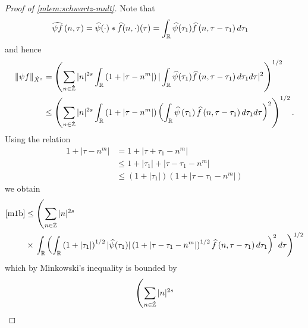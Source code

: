 \begin{proof}[Proof of \cref{mlem:schwartz-mult}]
Note that
%
%
\begin{equation*}
	\begin{split}
		\widehat{\psi f}\left( n, \tau \right)
		& = \widehat{\psi}(\cdot) * \widehat{f}(n,
		\cdot)(\tau)
		= \int_{\mathbb{R}} \widehat{\psi}(\tau_1) \widehat{f} \left( n, \tau - \tau_1 \right) 
		d\tau_1
	\end{split}
\end{equation*}
%
%
and hence
%
%
\begin{equation}
	\label{m1b}
	\begin{split}
		\|\psi f\|_{\dot{X}^s} 
		& = \left( \sum_{n \in \dot{\mathbb{Z}}} |n|^{2s} \int_{\mathbb{R}} \left( 1 + | \tau -
		n^{m} | \right) | \int_{\mathbb{R}} \widehat{\psi}(\tau_1) \widehat{f}\left( n, \tau -
		\tau_1
		\right)  d \tau_1 d \tau |^2 \right)^{1/2}
		\\
		& \le \left( \sum_{n \in \dot{\mathbb{Z}}} |n|^{2s} \int_{\mathbb{R}} \left( 1 + | \tau -
		n^{m }
		|
		\right) \left( \int_{\mathbb{R}} \widehat{\psi}\left( \tau_1 \right) \widehat{f}\left( n,
		\tau - \tau_1
		\right)  d \tau_1 d \tau \right)^2 \right)^{1/2}.
	\end{split}
\end{equation}
%
%
Using the relation
%
%
\begin{equation*}
	\begin{split}
		1 + | \tau - n^{m } |
		& = 1 + | \tau + \tau_1 - n^{m} |
		\\
		& \le 1 + | \tau_1 | + | \tau - \tau_1 - n^{m} |
		\\
		& \le \left( 1 + | \tau_1 | \right)\left( 1 + | \tau - \tau_1 -
		n^{m} | \right)
	\end{split}
\end{equation*}
%
%
we obtain
%
%
\begin{equation*}
	\begin{split}
		\eqref{m1b}
		& \le \left( \sum_{n \in \dot{\mathbb{Z}}} |n|^{2s} \right.
		\\
		& \times \left . \int_{\mathbb{R}} \left(
		\int_{\mathbb{R}} \left( 1 + | \tau_1 | \right)^{1/2} | \widehat{\psi}(\tau_1) |
		\left( 1 + | \tau - \tau_1 - n^{m} | \right)^{1/2} \widehat{f}\left( n, \tau
		- \tau_1
		\right)d \tau_1
		\right)^2 d \tau \right)^{1/2}
	\end{split}
\end{equation*}
%
%
which by Minkowski's inequality is bounded by
%
%
\begin{equation}
	\label{m2b}
	\begin{split}
		& \left( \sum_{n \in \zzdot} |n|^{2s}  \right.
		\\

\end{split}
\end{equation}
\end{proof}

